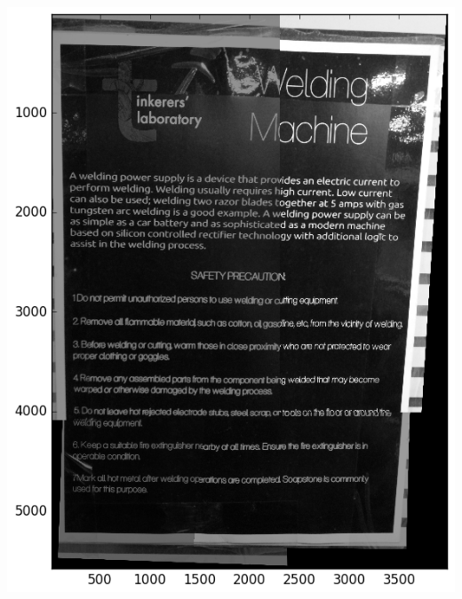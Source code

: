 \documentclass{article}
\begin{document}
\includegraphics[scale=0.25]{welding_machine/figure_1}
\end{document}
